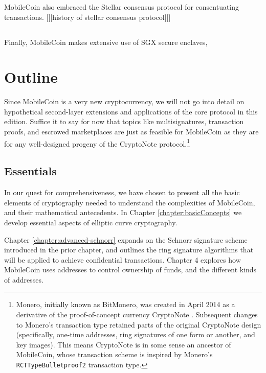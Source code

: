 MobileCoin also embraced the Stellar consensus protocol for consentuating transactions. [[[history of stellar consensus protocol]]]


\subsection{}

Finally, MobileCoin makes extensive use of SGX secure enclaves, 
\fi


\section{Outline}

Since MobileCoin is a very new cryptocurrency, we will not go into detail on hypothetical second-layer extensions and applications of the core protocol in this edition. Suffice it to say for now that topics like multisignatures, transaction proofs, and escrowed marketplaces are just as feasible for MobileCoin as they are for any well-designed progeny of the CryptoNote protocol.\footnote{Monero, initially known as BitMonero, was created in April 2014 as a derivative of the proof-of-concept currency CryptoNote \cite{bitmonero-launched}. Subsequent changes to Monero's transaction type retained parts of the original CryptoNote design (specifically, one-time addresses, ring signatures of one form or another, and key images). This means CryptoNote is in some sense an ancestor of MobileCoin, whose transaction scheme is inspired by Monero's {\tt RCTTypeBulletproof2} transaction type.}


\subsection{Essentials}%

In our quest for comprehensiveness, we have chosen to present all the basic elements of cryptography needed to understand the complexities of MobileCoin, and their mathematical antecedents. In Chapter \ref{chapter:basicConcepts} we develop essential aspects of elliptic curve cryptography.

Chapter \ref{chapter:advanced-schnorr} expands on the Schnorr signature scheme introduced in the prior chapter, and outlines the ring signature algorithms that will be applied to achieve confidential transactions. Chapter 4 explores how MobileCoin uses addresses to control ownership of funds, and the different kinds of addresses.%

